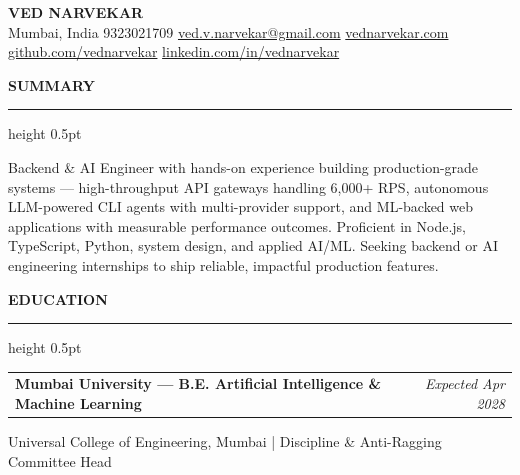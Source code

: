 \documentclass[a4paper,10pt]{article}
\newcommand{\fontsizeheader}{\fontsize{22}{25}\selectfont}
\newcommand{\fontsizesection}{\fontsize{8.2}{11}\selectfont}
\newcommand{\fontsizemeta}{\fontsize{8.2}{12}\selectfont}
\newcommand{\fontsizetitle}{\fontsize{10}{13}\selectfont}
\newcommand{\fontsizebody}{\fontsize{9}{14}\selectfont}
\newcommand{\resumesection}[1]{%
    \vspace{8pt}
    {\color{accent}\fontsizesection\textbf{\MakeUppercase{#1}}}
    \vspace{2pt}
    {\color{rule}\hrule height 0.5pt}
    \vspace{4pt}
}
\begin{document}
\begin{center}
    {\fontsizeheader\textbf{VED NARVEKAR}}\\[4pt]
    {\fontsizemeta\color{gray} Mumbai, India \hspace{2pt}{\color{lgray}|}\hspace{2pt} 9323021709 \hspace{2pt}{\color{lgray}|}\hspace{2pt} \href{mailto:ved.v.narvekar@gmail.com}{ved.v.narvekar@gmail.com} \hspace{2pt}{\color{lgray}|}\hspace{2pt} \href{https://vednarvekar.com}{vednarvekar.com} \hspace{2pt}{\color{lgray}|}\hspace{2pt} \href{https://github.com/vednarvekar}{github.com/vednarvekar} \hspace{2pt}{\color{lgray}|}\hspace{2pt} \href{https://linkedin.com/in/vednarvekar}{linkedin.com/in/vednarvekar}}
\end{center}
\vspace{2pt}

\resumesection{Summary}
{\fontsizebody Backend \& AI Engineer with hands-on experience building production-grade systems — high-throughput API gateways handling 6,000+ RPS, autonomous LLM-powered CLI agents with multi-provider support, and ML-backed web applications with measurable performance outcomes. Proficient in Node.js, TypeScript, Python, system design, and applied AI/ML. Seeking backend or AI engineering internships to ship reliable, impactful production features.\par}

\resumesection{Education}
\begin{tabularx}{\textwidth}{@{}X r@{}}
    {\fontsizetitle\textbf{Mumbai University — B.E. Artificial Intelligence \& Machine Learning}} & {\fontsizemeta\color{gray}\textit{Expected Apr 2028}}
\end{tabularx}
\vspace{1pt}
{\fontsizemeta\color{gray} Universal College of Engineering, Mumbai \hspace{3pt}|\hspace{3pt} Discipline \& Anti-Ragging Committee Head\par}
\end{document}
